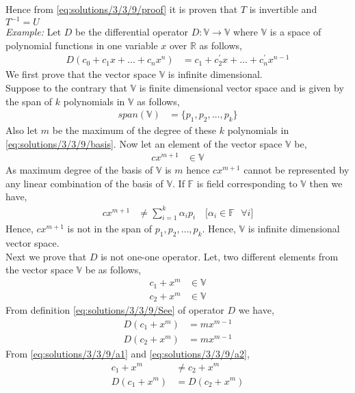 Hence from \eqref{eq:solutions/3/3/9/proof} it is proven that $T$ is invertible and $T^{-1} = U$
\\
{\em Example: }
Let $D$ be the differential operator $D:\mathbb{V} \xrightarrow{} \mathbb{V}$ where $\mathbb{V}$ is a space of polynomial functions in one variable $x$ over $\mathbb{R}$ as follows,
\begin{align}
D(c_0+c_1x+\dots+c_nx^n) &= c_1+c^{\prime}_2x+\dots+c^{\prime}_nx^{n-1}\label{eq:solutions/3/3/9/See}
\end{align}
We first prove that the vector space $\mathbb{V}$ is infinite dimensional.\\
Suppose to the contrary that $\mathbb{V}$ is finite dimensional vector space and is given by the span of $k$ polynomials in $\mathbb{V}$ as follows,
\begin{align}
span(\mathbb{V}) &= \{p_1,p_2,\dots,p_k\}\label{eq:solutions/3/3/9/basis}
\end{align}
Also let $m$ be the maximum of the degree of these $k$ polynomials in \eqref{eq:solutions/3/3/9/basis}. Now let an element of the vector space $\mathbb{V}$ be,
\begin{align}
cx^{m+1} &\in \mathbb{V}
\end{align}
As maximum degree of the basis of $\mathbb{V}$ is $m$ hence $cx^{m+1}$ cannot be represented by any linear combination of the basis of $\mathbb{V}$. If $\mathbb{F}$ is field corresponding to $\mathbb{V}$ then we have,
\begin{align}
cx^{m+1} &\ne \sum_{i=1}^{k}\alpha_ip_i \quad{\text{[$\alpha_i \in \mathbb{F}$ $\forall i$]}}
\end{align}
Hence, $cx^{m+1}$ is not in the span of ${p_1,p_2,\dots,p_k}$. Hence, $\mathbb{V}$ is infinite dimensional vector space.\\
Next we prove that $D$ is not one-one operator. Let, two different elements from the vector space $\mathbb{V}$ be as follows,
\begin{align}
c_1+x^m &\in \mathbb{V}\\
c_2+x^m &\in \mathbb{V}
\end{align}
From definition \eqref{eq:solutions/3/3/9/See} of operator $D$ we have,
\begin{align}
D(c_1+x^m) &= mx^{m-1}\label{eq:solutions/3/3/9/a1}\\
D(c_2+x^m) &= mx^{m-1}\label{eq:solutions/3/3/9/a2}
\end{align}
From \eqref{eq:solutions/3/3/9/a1} and \eqref{eq:solutions/3/3/9/a2},
\begin{align}
c_1+x^m &\ne c_2+x^m\\
D(c_1+x^m) &= D(c_2+x^m)\label{eq:solutions/3/3/9/Not_Oneone}
\end{align}
